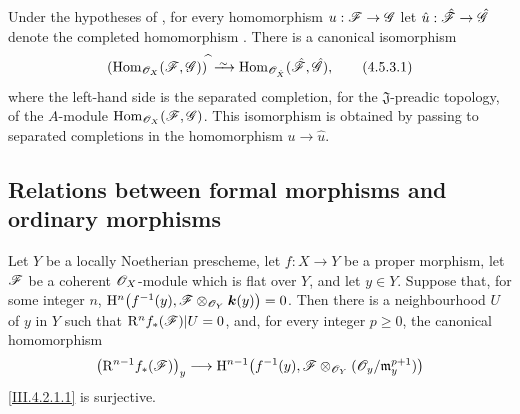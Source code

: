 \begin{corollary}[4.5.3]
\label{III.4.5.3}
Under the hypotheses of , for every homomorphism
$u:\mathscr{F}\to\mathscr{G}$ let $\hat{u}:\hat{\mathscr{F}}\to\hat{\mathscr{G}}$
denote the completed homomorphism .  There is a
canonical isomorphism
\[
\label{III.4.5.3.1}
  \left(\Hom_{\sh{O}_X}(\sh{F},\sh{G})\right)^{\widehat{\,}}
  \isoto
  \Hom_{\sh{O}_{\hat{X}}}(\hat{\sh{F}},\hat{\sh{G}}),
  \tag{4.5.3.1}
\]
where the left-hand side is the separated completion, for the
$\mathfrak J$-preadic topology, of the $A$-module
$\operatorname{Hom}_{\mathscr{O}_X}(\mathscr{F},\mathscr{G})$.  This isomorphism is obtained by
passing to separated completions in the homomorphism
$u\to\hat{u}$.
\end{corollary}


\subsection{Relations between formal morphisms and ordinary morphisms}
\label{subsection:III.4.6}

\begin{proposition}[4.6.1]
\label{III.4.6.1}
Let $Y$ be a locally Noetherian prescheme, let $f:X\to Y$ be a
proper morphism, let $\mathscr{F}$ be a coherent $\mathscr{O}_X$-module which
is flat over $Y$, and let $y\in Y$.  Suppose that, for some integer
$n$, $\mathrm{H}^n\bigl(f^{-1}(y),
\mathscr{F}\otimes_{\mathscr{O}_Y}\boldsymbol{k}(y)\bigr)=0$.
Then there is a neighbourhood $U$ of $y$ in $Y$ such that $\mathrm{R}^n f_*(\mathscr{F})|U=0$,
and, for every integer $p\geq0$, the canonical homomorphism
\[
  \bigl(\mathrm{R}^{n-1}f_*(\mathscr{F})\bigr)_y
  \longrightarrow
  \mathrm{H}^{n-1}\bigl(f^{-1}(y),
    \mathscr{F}\otimes_{\mathscr{O}_Y}
      (\mathscr{O}_y/\mathfrak m_y^{p+1})\bigr)
\]
\eqref{III.4.2.1.1} is surjective.
\end{proposition}

